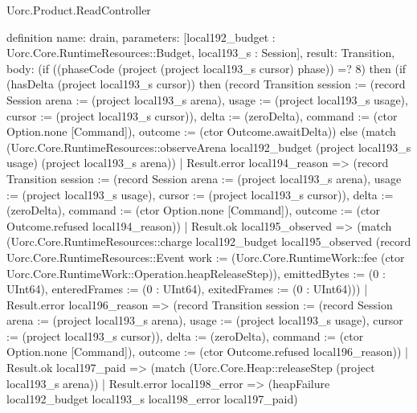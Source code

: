 \begin{lexlean}{Uorc.Product.ReadController}
\begin{semanticmodule}
definition{
  name: drain,
  parameters: [local192_budget : Uorc.Core.RuntimeResources::Budget, local193_s : Session],
  result: Transition,
  body: (if ((phaseCode (project (project local193_s cursor) phase)) =? 8) then (if (hasDelta (project local193_s cursor)) then (record Transition {session := (record Session {arena := (project local193_s arena), usage := (project local193_s usage), cursor := (project local193_s cursor)}), delta := (zeroDelta), command := (ctor Option.none [Command]), outcome := (ctor Outcome.awaitDelta)}) else (match (Uorc.Core.RuntimeResources::observeArena local192_budget (project local193_s usage) (project local193_s arena))
    | Result.error local194_reason => (record Transition {session := (record Session {arena := (project local193_s arena), usage := (project local193_s usage), cursor := (project local193_s cursor)}), delta := (zeroDelta), command := (ctor Option.none [Command]), outcome := (ctor Outcome.refused local194_reason)})
    | Result.ok local195_observed => (match (Uorc.Core.RuntimeResources::charge local192_budget local195_observed (record Uorc.Core.RuntimeResources::Event {work := (Uorc.Core.RuntimeWork::fee (ctor Uorc.Core.RuntimeWork::Operation.heapReleaseStep)), emittedBytes := (0 : UInt64), enteredFrames := (0 : UInt64), exitedFrames := (0 : UInt64)}))
      | Result.error local196_reason => (record Transition {session := (record Session {arena := (project local193_s arena), usage := (project local193_s usage), cursor := (project local193_s cursor)}), delta := (zeroDelta), command := (ctor Option.none [Command]), outcome := (ctor Outcome.refused local196_reason)})
      | Result.ok local197_paid => (match (Uorc.Core.Heap::releaseStep (project local193_s arena))
        | Result.error local198_error => (heapFailure local192_budget local193_s local198_error local197_paid)
}
\end{semanticmodule}
\end{lexlean}
